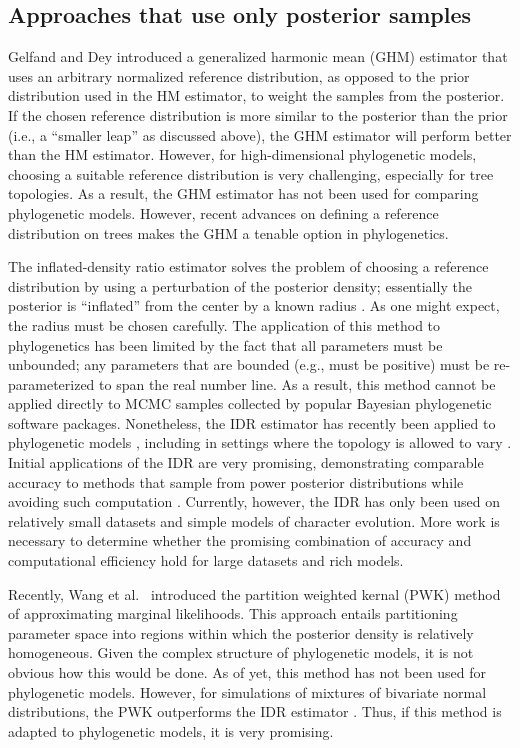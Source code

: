 \subsection{Approaches that use only posterior samples}

Gelfand and Dey \citeyear{Gelfand1994} introduced a generalized harmonic mean (GHM)
estimator that uses an arbitrary normalized reference distribution, as opposed
to the prior distribution used in the HM estimator, to weight the samples from
the posterior.
If the chosen reference distribution is more similar to the posterior than the
prior (i.e., a ``smaller leap'' as discussed above), the GHM estimator will
perform better than the HM estimator.
However, for high-dimensional phylogenetic models, choosing a suitable
reference distribution is very challenging, especially for tree topologies.
As a result, the GHM estimator has not been used for comparing phylogenetic
models.
However, recent advances on defining a reference distribution on trees
\citep{Holder2014} makes the GHM a tenable option in phylogenetics.

The inflated-density ratio estimator solves the problem of choosing a reference
distribution by using a perturbation of the posterior density; essentially the
posterior is ``inflated'' from the center by a known radius
\citep{Petris2007,Arima2012,Arima2014}.
As one might expect, the radius must be chosen carefully.
The application of this method to phylogenetics has been limited by the fact
that all parameters must be unbounded; any parameters that are bounded (e.g.,
must be positive) must be re-parameterized to span the real number line.
As a result, this method cannot be applied directly to MCMC samples collected
by popular Bayesian phylogenetic software packages.
Nonetheless, the IDR estimator has recently been applied to phylogenetic models
\citep{Arima2014}, including in settings where the topology is allowed to vary
\citep{Wu2014}.
Initial applications of the IDR are very promising, demonstrating comparable
accuracy to methods that sample from power posterior distributions while
avoiding such computation \citep{Arima2014,Wu2014}.
Currently, however, the IDR has only been used on relatively small datasets and
simple models of character evolution.
More work is necessary to determine whether the promising combination of
accuracy and computational efficiency hold for large datasets and rich models.

Recently, Wang et al.\ \citeyear{Wang2017} introduced the partition weighted
kernal (PWK) method of approximating marginal likelihoods.
This approach entails partitioning parameter space into regions within which
the posterior density is relatively homogeneous.
Given the complex structure of phylogenetic models, it is not obvious how this
would be done.
As of yet, this method has not been used for phylogenetic models.
However, for simulations of mixtures of bivariate normal distributions, the
PWK outperforms the IDR estimator \citep{Wang2017}.
Thus, if this method is adapted to phylogenetic models, it is very promising.

